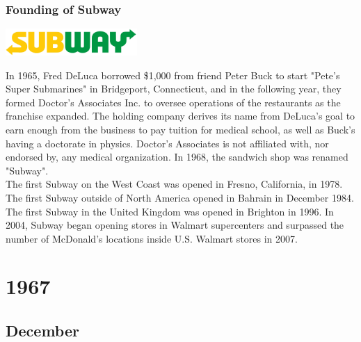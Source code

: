 \documentclass[11pt]{report}
\begin{document}
\subsection{Founding of Subway}
\vspace{2mm}\begin{center}\includegraphics[width=5cm]{./img/subwayLogo.jpg}\end{center}
In 1965, Fred DeLuca borrowed \$1,000 from friend Peter Buck to start "Pete's Super Submarines" in Bridgeport, Connecticut, and in the following year, they formed Doctor's Associates Inc. to oversee operations of the restaurants as the franchise expanded. The holding company derives its name from DeLuca's goal to earn enough from the business to pay tuition for medical school, as well as Buck's having a doctorate in physics. Doctor's Associates is not affiliated with, nor endorsed by, any medical organization. In 1968, the sandwich shop was renamed "Subway".\\
\indent The first Subway on the West Coast was opened in Fresno, California, in 1978. The first Subway outside of North America opened in Bahrain in December 1984. The first Subway in the United Kingdom was opened in Brighton in 1996. In 2004, Subway began opening stores in Walmart supercenters and surpassed the number of McDonald's locations inside U.S. Walmart stores in 2007.

\chapter{1967}
\section{December}
\end{document}

